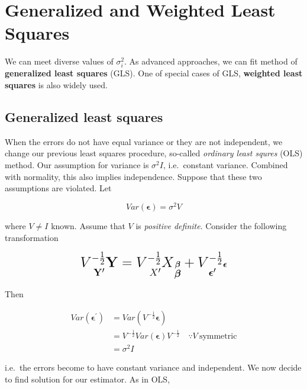 \documentclass[]{book}
\newcommand{\E}{\boldsymbol\epsilon}
\theoremstyle{definition}
\theoremstyle{definition}
\theoremstyle{definition}
\theoremstyle{remark}
\begin{document}
\hypertarget{generalized-and-weighted-least-squares}{%
\section{Generalized and Weighted Least Squares}\label{generalized-and-weighted-least-squares}}

We can meet diverse values of \(\sigma_i^2\). As advanced approaches, we can fit method of \textbf{generalized least squares} (GLS). One of special cases of GLS, \textbf{weighted least squares} is also widely used.

\hypertarget{generalized-least-squares}{%
\subsection{Generalized least squares}\label{generalized-least-squares}}

When the errors do not have equal variance or they are not independent, we change our previous least squares procedure, so-called \emph{ordinary least squres} (OLS) method. Our assumption for variance is \(\sigma^2 I\), i.e.~constant variance. Combined with normality, this also implies independence. Suppose that these two assumptions are violated. Let

\[Var(\E) = \sigma^2 V\]

where \(V \neq I\) known. Assume that \(V\) is \emph{positive definite}. Consider the following transformation

\begin{equation}
  \underset{\LARGE \mathbf{Y}^{\prime}}{V^{- \frac{1}{2}} \mathbf{Y}} = \underset{\LARGE X^{\prime}}{V^{- \frac{1}{2}} X} \underset{\LARGE \boldsymbol\beta}{\boldsymbol\beta} + \underset{\LARGE \E^{\prime}}{V^{- \frac{1}{2}} \E}
  \label{eq:glsmod}
\end{equation}

Then

\begin{equation}
  \begin{split}
    Var(\E^{\prime}) & = Var(V^{- \frac{1}{2}} \E) \\
    & = V^{- \frac{1}{2}} Var(\E) V^{- \frac{1}{2}} \quad \because V \:\text{symmetric} \\
    & = \sigma^2 I
  \end{split}
  \label{eq:glssig}
\end{equation}

i.e.~the errors become to have constant variance and independent. We now decide to find solution for our estimator. As in OLS,
\end{document}
